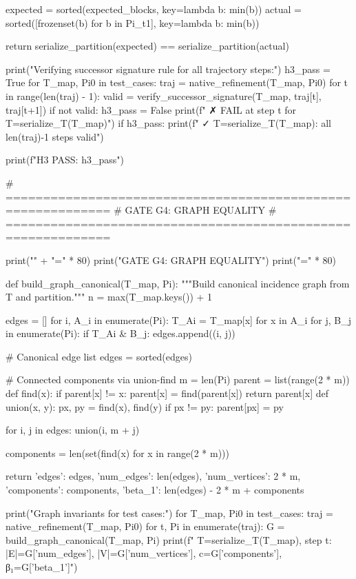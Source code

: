     expected = sorted(expected_blocks, key=lambda b: min(b))
    actual = sorted([frozenset(b) for b in Pi_t1], key=lambda b: min(b))
    
    return serialize_partition(expected) == serialize_partition(actual)

print("\n  Verifying successor signature rule for all trajectory steps:")
h3_pass = True
for T_map, Pi0 in test_cases:
    traj = native_refinement(T_map, Pi0)
    for t in range(len(traj) - 1):
        valid = verify_successor_signature(T_map, traj[t], traj[t+1])
        if not valid:
            h3_pass = False
            print(f"    ✗ FAIL at step {t} for T={serialize_T(T_map)}")
    if h3_pass:
        print(f"    ✓ T={serialize_T(T_map)}: all {len(traj)-1} steps valid")

print(f"\n  H3 PASS: {h3_pass}")

# ============================================================
# GATE G4: GRAPH EQUALITY
# ============================================================

print("\n" + "=" * 80)
print("GATE G4: GRAPH EQUALITY")
print("=" * 80)

def build_graph_canonical(T_map, Pi):
    """Build canonical incidence graph from T and partition."""
    n = max(T_map.keys()) + 1
    
    edges = []
    for i, A_i in enumerate(Pi):
        T_Ai = {T_map[x] for x in A_i}
        for j, B_j in enumerate(Pi):
            if T_Ai & B_j:
                edges.append((i, j))
    
    # Canonical edge list
    edges = sorted(edges)
    
    # Connected components via union-find
    m = len(Pi)
    parent = list(range(2 * m))
    def find(x):
        if parent[x] != x:
            parent[x] = find(parent[x])
        return parent[x]
    def union(x, y):
        px, py = find(x), find(y)
        if px != py:
            parent[px] = py
    
    for i, j in edges:
        union(i, m + j)
    
    components = len(set(find(x) for x in range(2 * m)))
    
    return {
        'edges': edges,
        'num_edges': len(edges),
        'num_vertices': 2 * m,
        'components': components,
        'beta_1': len(edges) - 2 * m + components
    }

print("\n  Graph invariants for test cases:")
for T_map, Pi0 in test_cases:
    traj = native_refinement(T_map, Pi0)
    for t, Pi in enumerate(traj):
        G = build_graph_canonical(T_map, Pi)
        print(f"    T={serialize_T(T_map)}, step {t}: |E|={G['num_edges']}, |V|={G['num_vertices']}, c={G['components']}, β₁={G['beta_1']}")

